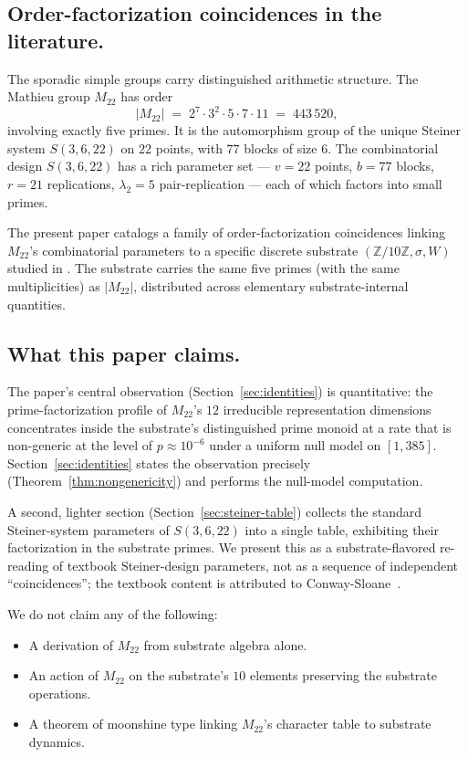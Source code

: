 \documentclass[11pt,reqno]{amsart}
\theoremstyle{plain}
\theoremstyle{definition}
\theoremstyle{remark}
\newcommand{\Z}{\mathbb{Z}}
\newcommand{\Mtwentytwo}{M_{22}}
\newcommand{\sig}{\sigma}
\begin{document}
\subsection{Order-factorization coincidences in the literature.}
The sporadic simple groups carry distinguished arithmetic structure.
The Mathieu group $\Mtwentytwo$ has order
\[
  |\Mtwentytwo| \;=\; 2^{7} \cdot 3^{2} \cdot 5 \cdot 7 \cdot 11
                \;=\; 443\,520,
\]
involving exactly five primes. It is the automorphism group of the
unique Steiner system $S(3, 6, 22)$ on $22$ points, with $77$ blocks
of size $6$. The combinatorial design $S(3, 6, 22)$ has a rich
parameter set --- $v = 22$ points, $b = 77$ blocks, $r = 21$
replications, $\lambda_{2} = 5$ pair-replication --- each of which
factors into small primes.

The present paper catalogs a family of order-factorization
coincidences linking $\Mtwentytwo$'s combinatorial parameters to a
specific discrete substrate $(\Z/10\Z, \sig, W)$ studied in
\cite{SandersGishFourCore}. The substrate carries the same five primes
(with the same multiplicities) as $|\Mtwentytwo|$, distributed across
elementary substrate-internal quantities.

\subsection{What this paper claims.}
The paper's central observation (Section~\ref{sec:identities}) is
quantitative: the prime-factorization profile of $\Mtwentytwo$'s
$12$ irreducible representation dimensions concentrates inside the
substrate's distinguished prime monoid at a rate that is
non-generic at the level of $p \approx 10^{-6}$ under a uniform
null model on $[1, 385]$. Section~\ref{sec:identities} states the
observation precisely (Theorem~\ref{thm:nongenericity}) and
performs the null-model computation.

A second, lighter section (Section~\ref{sec:steiner-table})
collects the standard Steiner-system parameters of $S(3, 6, 22)$
into a single table, exhibiting their factorization in the
substrate primes. We present this as a substrate-flavored
re-reading of textbook Steiner-design parameters, not as a
sequence of independent ``coincidences''; the textbook content is
attributed to Conway-Sloane~\cite{ConwaySloane1999}.

We do not claim any of the following:
\begin{itemize}\setlength\itemsep{2pt}
\item A derivation of $\Mtwentytwo$ from substrate algebra alone.
\item An action of $\Mtwentytwo$ on the substrate's $10$ elements
preserving the substrate operations.
\item A theorem of moonshine type linking $\Mtwentytwo$'s character
table to substrate dynamics.
\end{itemize}
\end{document}

